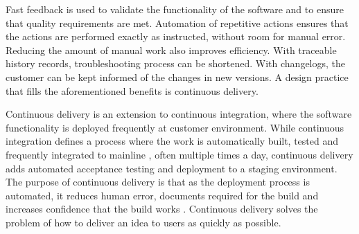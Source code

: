 \documentclass[english]{tktltiki2}
\theoremstyle{definition}
\theoremstyle{remark}
\begin{document}
Fast feedback is used to validate the functionality of the software and to ensure that quality requirements are met. Automation of repetitive actions ensures that the actions are performed exactly as instructed, without room for manual error. Reducing the amount of manual work also improves efficiency. With traceable history records, troubleshooting process can be shortened. With changelogs, the customer can be kept informed of the changes in new versions. A design practice that fills the aforementioned benefits is continuous delivery.

Continuous delivery is an extension to continuous integration, where the software functionality is deployed frequently at customer environment. While continuous integration defines a process where the work is automatically built, tested and frequently integrated to mainline \cite{fowler2006continuous}, often multiple times a day, continuous delivery adds automated acceptance testing and deployment to a staging environment. The purpose of continuous delivery is that as the deployment process is automated, it reduces human error, documents required for the build and increases confidence that the build works \cite{cdbook}. Continuous delivery solves the problem of how to deliver an idea to users as quickly as possible.
\end{document}
